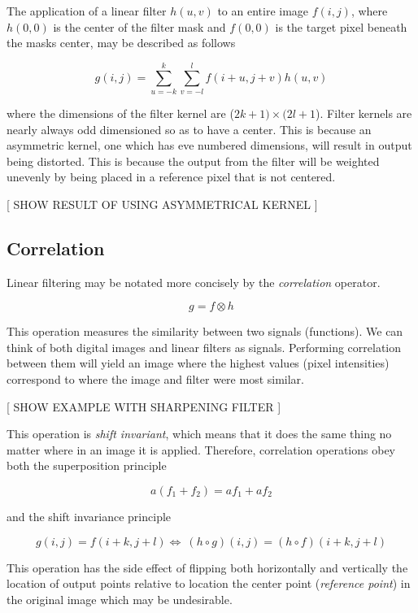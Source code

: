 The application of a linear filter $h(u,v)$ to an entire image $f(i,j)$, where $h(0,0)$ is the center of the filter mask and $f(0,0)$ is the target pixel beneath the masks center, may be described as follows

\begin{equation} \label{eq:1}
g(i,j) = \sum_{u=-k}^{k}\sum_{v = -l}^{l}f(i+u,j+v)h(u,v)
\end{equation}


where the dimensions of the filter kernel are ($2k+1) \times (2l+1$). Filter kernels are nearly always odd dimensioned so as to have a center. This is because an asymmetric kernel, one which has eve numbered dimensions, will result in output being distorted. This is because the output from the filter will be weighted unevenly by being placed in a reference pixel that is not centered.

[ SHOW RESULT OF USING ASYMMETRICAL KERNEL ] 



\subsection{Correlation}

Linear filtering may be notated more concisely by the \emph{correlation} operator.

\[g = f \otimes h\]

This operation measures the similarity between two signals (functions). We can think of both digital images and linear filters as signals. Performing correlation between them will yield an image where the highest values (pixel intensities) correspond to where the image and filter were most similar\cite{optimalKernel}.


[ SHOW EXAMPLE WITH SHARPENING FILTER ]

This operation is \emph{shift invariant}, which means that it does the same thing no matter where in an image it is applied. Therefore, correlation operations obey both the superposition principle

\[a(f_1 + f_2) = af_1 + af_2\]

and the shift invariance principle

\[g(i,j)=f(i+k,j+l) \Leftrightarrow\ (h\circ g)(i,j)=(h\circ f)(i+k,j+l)\]

This operation has the side effect of flipping both horizontally and vertically the location of output points relative to location the center point (\emph{reference point}) in the original image which may be undesirable.

